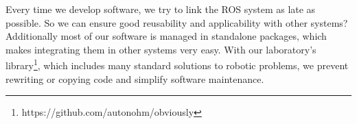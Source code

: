 Every time we develop software, we try to link the ROS system as late as possible. So we can ensure good reusability and applicability with other systems? Additionally most of our software is managed in standalone packages, which makes integrating them in other systems very easy. With our laboratory's library\footnote{https://github.com/autonohm/obviously}, which includes many standard solutions to robotic problems, we prevent rewriting or copying code and simplify software maintenance.